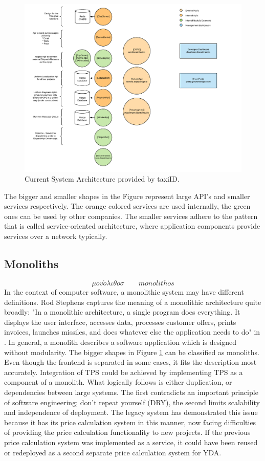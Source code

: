 \begin{figure}[H]
	\centering
	\includegraphics[width=1\textwidth]{Architecture}
	\caption[Current System Architecture]{Current System Architecture provided by taxiID.}
	\label{fig:Architecture}
\end{figure}

The bigger and smaller shapes in the Figure represent large API's and smaller services respectively. The orange colored services are used internally, the green ones can be used by other companies. The smaller services adhere to the pattern that is called service-oriented architecture, where application components provide services over a network typically.

\subsection{Monoliths}
\[\mu ov \acute{o} \lambda \iota \theta o \sigma \qquad monolithos\]
In the context of computer software, a monolithic system may have different definitions. Rod Stephens captures the meaning of a monolithic architecture quite broadly: "In a monolithic architecture, a single program does everything. It displays the user interface, accesses data, processes customer offers, prints invoices, launches missiles, and does whatever else the application needs to do" in \cite{rod-BSE}. In general, a monolith describes a software application which is designed without modularity. The bigger shapes in Figure \ref{fig:Architecture} can be classified as monoliths. Even though the frontend is separated in some cases, it fits the description most accurately. Integration of TPS could be achieved by implementing TPS as a component of a monolith. What logically follows is either duplication, or dependencies between large systems. The first contradicts an important principle of software engineering; don't repeat yourself (DRY), the second limits scalability and independence of deployment. The legacy system has demonstrated this issue because it has its price calculation system in this manner, now facing difficulties of providing the price calculation functionality to new projects. If the previous price calculation system was implemented as a service, it could have been reused or redeployed as a second separate price calculation system for YDA.

